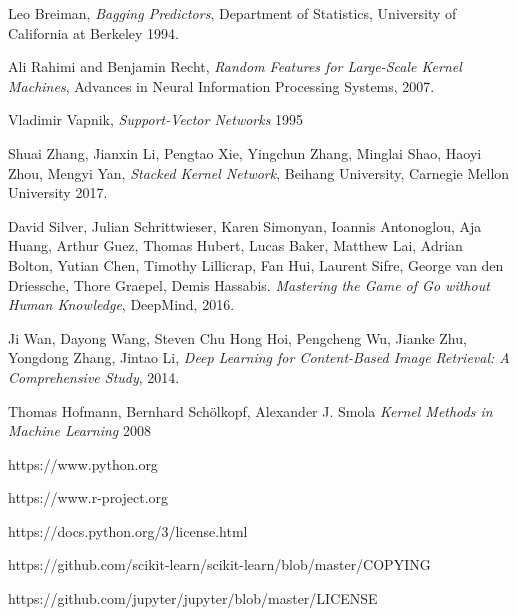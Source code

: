 \documentclass{article}
\begin{document}
\begin{thebibliography}{20}


Leo Breiman,
\textit{Bagging Predictors},
Department of Statistics, University of California at Berkeley
1994.

Ali Rahimi and Benjamin Recht,
\textit{Random Features for Large-Scale Kernel Machines},
Advances in Neural Information Processing Systems,
2007.

Vladimir Vapnik,
\textit{Support-Vector Networks}
1995

Shuai Zhang, Jianxin Li, Pengtao Xie, Yingchun Zhang, Minglai Shao, Haoyi Zhou, Mengyi Yan,
\textit{Stacked Kernel Network},
Beihang University, Carnegie Mellon University
2017.

David Silver, Julian Schrittwieser, Karen Simonyan, Ioannis Antonoglou, Aja Huang, Arthur
Guez, Thomas Hubert, Lucas Baker, Matthew Lai, Adrian Bolton, Yutian Chen, Timothy
Lillicrap, Fan Hui, Laurent Sifre, George van den Driessche, Thore Graepel, Demis Hassabis.
\textit{Mastering the Game of Go without Human Knowledge},
DeepMind,
2016.

Ji Wan, Dayong Wang, Steven Chu Hong Hoi, Pengcheng Wu, Jianke Zhu, Yongdong Zhang, Jintao Li,
\textit{Deep Learning for Content-Based Image Retrieval: A Comprehensive Study},
2014.

Thomas Hofmann, Bernhard Schölkopf, Alexander J. Smola
\textit{Kernel Methods in Machine Learning}
2008

https://www.python.org

https://www.r-project.org

https://docs.python.org/3/license.html

https://github.com/scikit-learn/scikit-learn/blob/master/COPYING

https://github.com/jupyter/jupyter/blob/master/LICENSE

\end{thebibliography}
\end{document}
